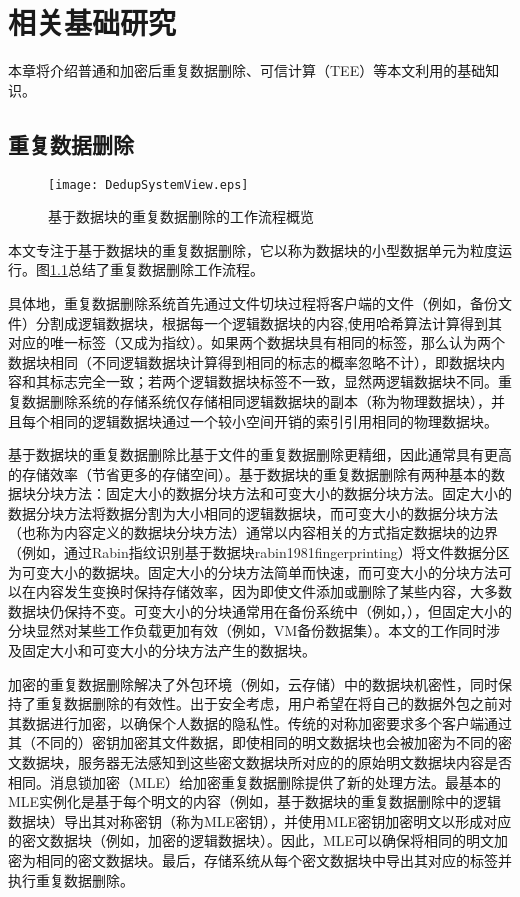 \chapter{相关基础研究}
\label{chapter:background}

本章将介绍普通和加密后重复数据删除、可信计算（TEE）等本文利用的基础知识。

\section{重复数据删除}
\label{sec:background-deduplication}


\begin{figure}[!htb]
    \small
    \centering
    \texttt{[image: DedupSystemView.eps]}
    \caption{基于数据块的重复数据删除的工作流程概览} 
    \label{fig:重复数据删除的工作流程概览}
\end{figure}

本文专注于基于数据块的重复数据删除，它以称为数据块的小型数据单元为粒度运行。图\ref{fig:重复数据删除的工作流程概览}总结了重复数据删除工作流程。 

具体地，重复数据删除系统首先通过文件切块过程将客户端的文件（例如，备份文件）分割成逻辑数据块，根据每一个逻辑数据块的内容,使用哈希算法计算得到其对应的唯一标签（又成为指纹）。如果两个数据块具有相同的标签，那么认为两个数据块相同（不同逻辑数据块计算得到相同的标志的概率忽略不计\cite{black2006compare}），即数据块内容和其标志完全一致；若两个逻辑数据块标签不一致，显然两逻辑数据块不同。重复数据删除系统的存储系统仅存储相同逻辑数据块的副本（称为物理数据块），并且每个相同的逻辑数据块通过一个较小空间开销的索引引用相同的物理数据块。  

基于数据块的重复数据删除比基于文件的重复数据删除更精细，因此通常具有更高的存储效率（节省更多的存储空间）。基于数据块的重复数据删除有两种基本的数据块分块方法：固定大小的数据分块方法和可变大小的数据分块方法。固定大小的数据分块方法将数据分割为大小相同的逻辑数据块，而可变大小的数据分块方法（也称为内容定义的数据块分块方法）通常以内容相关的方式指定数据块的边界（例如，通过Rabin指纹识别基于数据块{rabin1981fingerprinting}）将文件数据分区为可变大小的数据块。固定大小的分块方法简单而快速，而可变大小的分块方法可以在内容发生变换时保持存储效率，因为即使文件添加或删除了某些内容，大多数数据块仍保持不变。可变大小的分块通常用在备份系统中（例如，\cite{zhu2008avoiding,lillibridge2009sparse}），但固定大小的分块显然对某些工作负载更加有效（例如，VM备份数据集\cite{jin2009effectiveness}）。本文的工作同时涉及固定大小和可变大小的分块方法产生的数据块。

加密的重复数据删除解决了外包环境（例如，云存储）中的数据块机密性，同时保持了重复数据删除的有效性。出于安全考虑，用户希望在将自己的数据外包之前对其数据进行加密，以确保个人数据的隐私性。传统的对称加密要求多个客户端通过其（不同的）密钥加密其文件数据，即使相同的明文数据块也会被加密为不同的密文数据块，服务器无法感知到这些密文数据块所对应的的原始明文数据块内容是否相同。消息锁加密（MLE）\cite{bellare2013message}给加密重复数据删除提供了新的处理方法。最基本的MLE实例化是基于每个明文的内容（例如，基于数据块的重复数据删除中的逻辑数据块）导出其对称密钥（称为MLE密钥），并使用MLE密钥加密明文以形成对应的密文数据块（例如，加密的逻辑数据块）。因此，MLE可以确保将相同的明文加密为相同的密文数据块。最后，存储系统从每个密文数据块中导出其对应的标签并执行重复数据删除。

